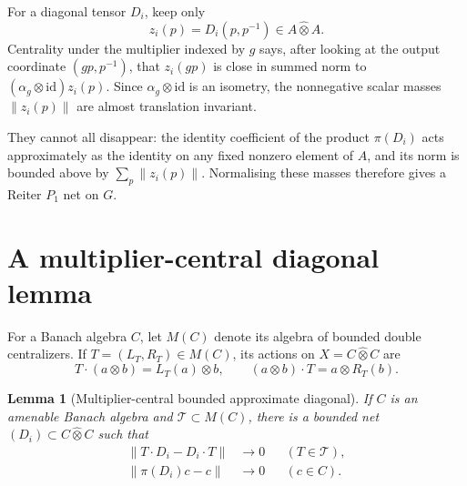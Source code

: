 \documentclass[11pt]{article}
\newtheorem{lemma}[theorem]{Lemma}
\newcommand{\whot}{\widehat{\otimes}}
\newcommand{\id}{\mathrm{id}}
\begin{document}
For a diagonal tensor \(D_i\), keep only
\[
 z_i(p)=D_i(p,p^{-1})\in A\whot A.
\]
Centrality under the multiplier indexed by \(g\) says, after looking at the
output coordinate \((gp,p^{-1})\), that \(z_i(gp)\) is close in summed norm
to \((\alpha_g\otimes\id)z_i(p)\).  Since \(\alpha_g\otimes\id\) is an
isometry, the nonnegative scalar masses \(\|z_i(p)\|\) are almost
translation invariant.

They cannot all disappear: the identity coefficient of the product
\(\pi(D_i)\) acts approximately as the identity on any fixed nonzero
element of \(A\), and its norm is bounded above by
\(\sum_p\|z_i(p)\|\).  Normalising these masses therefore gives a Reiter
\(P_1\) net on \(G\).

\section{A multiplier-central diagonal lemma}

For a Banach algebra \(C\), let \(M(C)\) denote its algebra of bounded double
centralizers.  If \(T=(L_T,R_T)\in M(C)\), its actions on
\(X=C\whot C\) are
\[
 T\cdot(a\otimes b)=L_T(a)\otimes b,
 \qquad (a\otimes b)\cdot T=a\otimes R_T(b).
\]

\begin{lemma}[Multiplier-central bounded approximate diagonal]
\label{lem:multiplier}
If \(C\) is an amenable Banach algebra and \(\mathcal T\subset M(C)\),
there is a bounded net \((D_i)\subset C\whot C\) such that
\begin{align*}
 \|T\cdot D_i-D_i\cdot T\|&\longrightarrow0 &&(T\in\mathcal T),\\
 \|\pi(D_i)c-c\|&\longrightarrow0 &&(c\in C).
\end{align*}
\end{lemma}
\end{document}
